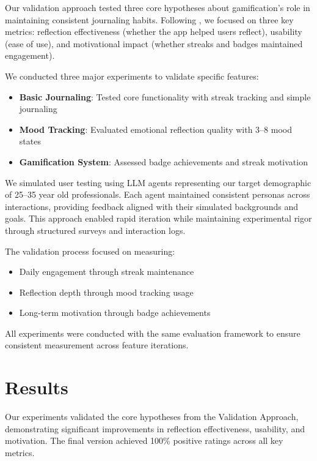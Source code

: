 \documentclass{article} %
\begin{document}
Our validation approach tested three core hypotheses about gamification's role in maintaining consistent journaling habits. Following \citet{lu2024aiscientist}, we focused on three key metrics: reflection effectiveness (whether the app helped users reflect), usability (ease of use), and motivational impact (whether streaks and badges maintained engagement).

We conducted three major experiments to validate specific features:

\begin{itemize}
    \item \textbf{Basic Journaling}: Tested core functionality with streak tracking and simple journaling
    \item \textbf{Mood Tracking}: Evaluated emotional reflection quality with 3--8 mood states
    \item \textbf{Gamification System}: Assessed badge achievements and streak motivation
\end{itemize}

We simulated user testing using LLM agents representing our target demographic of 25--35 year old professionals. Each agent maintained consistent personas across interactions, providing feedback aligned with their simulated backgrounds and goals. This approach enabled rapid iteration while maintaining experimental rigor through structured surveys and interaction logs.

The validation process focused on measuring:
\begin{itemize}
    \item Daily engagement through streak maintenance
    \item Reflection depth through mood tracking usage
    \item Long-term motivation through badge achievements
\end{itemize}

All experiments were conducted with the same evaluation framework to ensure consistent measurement across feature iterations.

\section{Results}
\label{sec:results}

Our experiments validated the core hypotheses from the Validation Approach, demonstrating significant improvements in reflection effectiveness, usability, and motivation. The final version achieved 100\% positive ratings across all key metrics.
\end{document}
